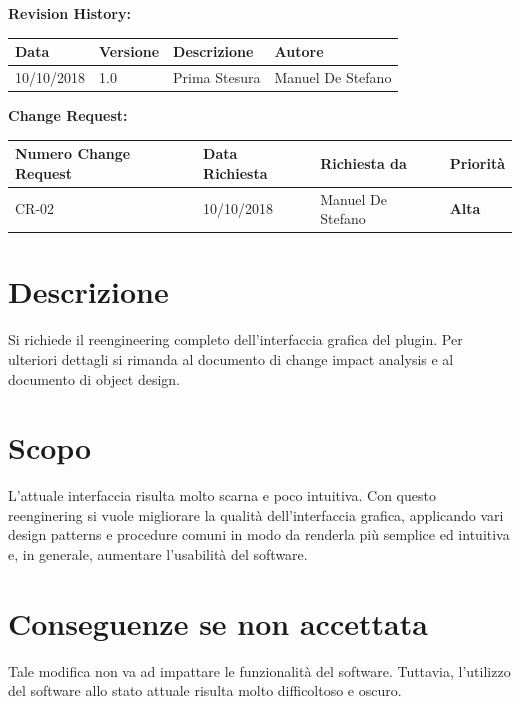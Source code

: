 	\textbf{Revision History:}
	\begin{table}[h]
		\centering
		\begin{tabularx}{0.9\textwidth}{|p{2cm}|l|X|p{3cm}|}
			\hline
			\textbf{Data} & \textbf{Versione} & \textbf{Descrizione} & \textbf{Autore} \\ \hline
			10/10/2018 & 1.0  & Prima Stesura & Manuel De Stefano \\ \hline
		\end{tabularx}
	\end{table}


	\textbf{Change Request:}
	\begin{table}[h!]
		\centering
		\begin{tabularx}{0.9\textwidth}{|p{3cm}|p{2cm}|X|l|}
			\hline
			\textbf{Numero Change Request} & \textbf{Data Richiesta} & \textbf{Richiesta da} & \textbf{Priorità} \\ \hline
			CR-02 & 10/10/2018 & Manuel De Stefano & \textbf{Alta} \\ \hline
		\end{tabularx}
	\end{table}


	
	\section{Descrizione}
		Si richiede il reengineering completo dell'interfaccia grafica del plugin. Per ulteriori dettagli si rimanda al documento di change impact analysis e al documento di object design.
	\section{Scopo}
		L'attuale interfaccia risulta molto scarna e poco intuitiva. Con questo reenginering si vuole migliorare la qualità dell'interfaccia grafica, applicando vari design patterns e procedure comuni in modo da renderla più semplice ed intuitiva e, in generale, aumentare l'usabilità del software.
		
	\section{Conseguenze se non accettata}
		Tale modifica non va ad impattare le funzionalità del software. Tuttavia, l'utilizzo del software allo stato attuale risulta molto difficoltoso e oscuro.
	

